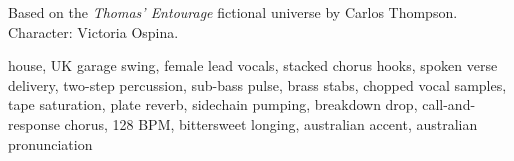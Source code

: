 

\begin{notes}
Based on the \emph{Thomas’ Entourage} fictional universe by Carlos Thompson.\\
Character: Victoria Ospina.\\
\end{notes}

\begin{style}
house, UK garage swing, female lead vocals, stacked chorus hooks, spoken verse delivery, two-step percussion, sub-bass pulse, brass stabs, chopped vocal samples, tape saturation, plate reverb, sidechain pumping, breakdown drop, call-and-response chorus, 128 BPM, bittersweet longing, australian accent, australian pronunciation
\end{style}

